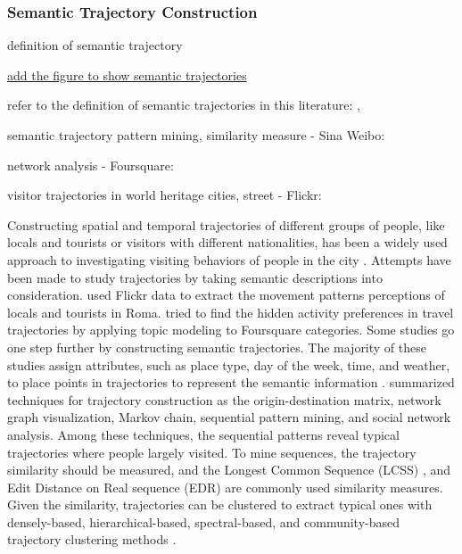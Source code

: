 \documentclass{article}
\begin{document}
\subsubsection{Semantic Trajectory Construction}
definition of semantic trajectory

\underline{add the figure to show semantic trajectories}

refer to the definition of semantic trajectories in this literature: \cite{yan_semantic_2011}, \cite{parent_semantic_2013}

semantic trajectory pattern mining, similarity measure - Sina Weibo: \cite{wan_semantic-geographic_2017}

network analysis - Foursquare: \cite{ferreira_uncovering_2020}

visitor trajectories in world heritage cities, street - Flickr: \cite{domenech_using_2020}

Constructing spatial and temporal trajectories of different groups of people, like locals and tourists or visitors with different nationalities, has been a widely used approach to investigating visiting behaviors of people in the city \cite{straumann_towards_2014, ferreira_beyond_2015}. Attempts have been made to study trajectories by taking semantic descriptions into consideration. \cite{girardin_digital_2008} used Flickr data to extract the movement patterns perceptions of locals and tourists in Roma. \underline{\cite{vu_discovering_2019}} tried to find the hidden activity preferences in travel trajectories by applying topic modeling to Foursquare categories. Some studies go one step further by constructing semantic trajectories. The majority of these studies assign attributes, such as place type, day of the week, time, and weather, to place points in trajectories to represent the semantic information \cite{petry_towards_2019,liu_stccd_2020}. \underline{\cite{vu_discovering_2019}} summarized techniques for trajectory construction as the origin-destination matrix, network graph visualization, Markov chain, sequential pattern mining, and social network analysis. Among these techniques, the sequential patterns reveal typical trajectories where people largely visited. To mine sequences, the trajectory similarity should be  measured, and the Longest Common Sequence (LCSS) \cite{vlachos_discovering_2002}, and Edit Distance on Real sequence (EDR) \cite{chen_similarity_2005} are commonly used similarity measures. Given the similarity, trajectories can be clustered to extract typical ones with densely-based, hierarchical-based, spectral-based, and community-based trajectory clustering methods \cite{liu_stccd_2020}.
\end{document}
